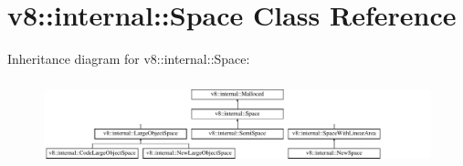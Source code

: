\hypertarget{classv8_1_1internal_1_1Space}{}\section{v8\+:\+:internal\+:\+:Space Class Reference}
\label{classv8_1_1internal_1_1Space}
Inheritance diagram for v8\+:\+:internal\+:\+:Space\+:\begin{figure}[H]
\begin{center}
\leavevmode
\includegraphics[height=2.500000cm]{classv8_1_1internal_1_1Space}
\end{center}
\end{figure}
